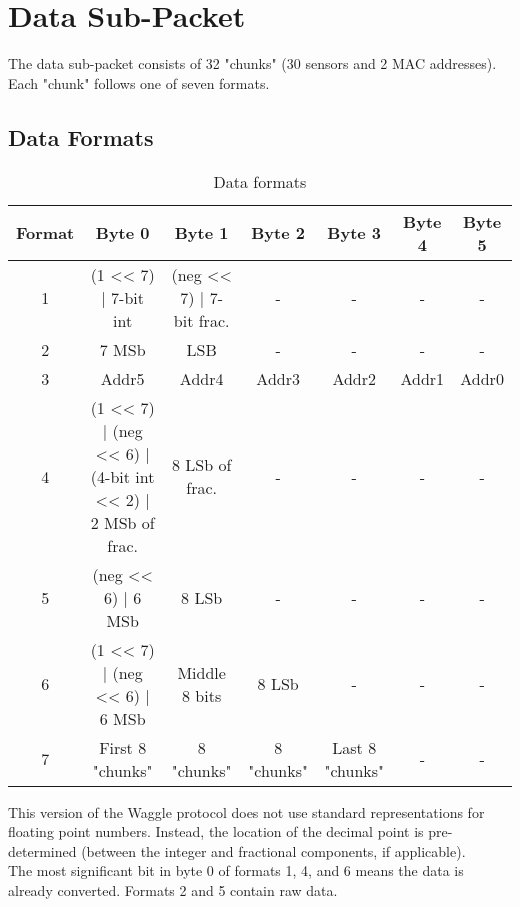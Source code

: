 \section{Data Sub-Packet} \label{section:dataSub}

The data sub-packet consists of 32 "chunks" (30 sensors and 2 MAC addresses).  Each "chunk" follows one of seven formats.\\


\subsection{Data Formats}

\begin{table}[H]
    \centering
    {
    \begin{tabular}{|c c c c c c c|}
        \hline
        \textbf{Format} & \textbf{Byte 0} & \textbf{Byte 1} & \textbf{Byte 2} & \textbf{Byte 3} & \textbf{Byte 4} & \textbf{Byte 5}\\
        \hline
        \hline
        1 & (1 << 7) | 7-bit int & (neg << 7) | 7-bit frac. & - & - & - & -\\
        2 & 7 MSb & LSB & - & - & - & -\\
        3 & Addr5 & Addr4 & Addr3 & Addr2 & Addr1 & Addr0\\
        4 &
        \multirow{1}{8em}{(1 << 7) | (neg << 6) | (4-bit int << 2) | 2 MSb of frac.}
        & 8 LSb of frac. & - & - & - & -\\[4ex]
        5 & (neg << 6) | 6 MSb & 8 LSb & - & - & - & -\\
        6 &
        \multirow{1}{9em}{(1 << 7) | (neg << 6) | 6 MSb}
        & Middle 8 bits & 8 LSb & - & - & -\\[2ex]
        7 & First 8 "chunks" & 8 "chunks" & 8 "chunks" & Last 8 "chunks" & - & -\\
        \hline
    \end{tabular}
    }
    \caption{Data formats}
    \label{table:overall}
\end{table}

This version of the Waggle protocol does not use standard representations for floating point numbers.  Instead, the location of the decimal point is pre-determined (between the integer and fractional components, if applicable).\\

The most significant bit in byte 0 of formats 1, 4, and 6 means the data is already converted.  Formats 2 and 5 contain raw data.\\

